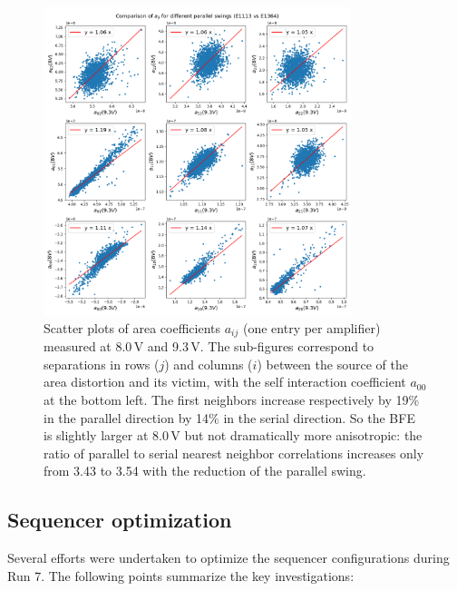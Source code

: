 \begin{figure}[ht]
\begin{centering}
\includegraphics[width=0.8\textwidth]{figures/aScatterPlots8vs9-3.png}
\end{centering}
\caption{Scatter plots of area coefficients $a_{ij}$ (one entry per amplifier)
measured at 8.0\,V and 9.3\,V. The sub-figures correspond to separations in rows ($j$) and columns ($i$)
between the source of the area distortion and its victim, with the self
interaction coefficient $a_{00}$ at the bottom left. The first neighbors increase
respectively by 19\% in the parallel direction by 14\% in the serial
direction. So the BFE is slightly larger at 8.0\,V but not dramatically
more anisotropic: the ratio of parallel to serial nearest neighbor correlations increases only from 3.43 to 3.54 with the reduction of the parallel swing.}
\label{fig:area-coeffs}
\end{figure}


\subsection{Sequencer optimization}\label{sequencer-optimization}
Several efforts were undertaken to optimize the sequencer configurations during Run 7. The following points summarize the key investigations:

